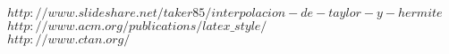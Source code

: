 \documentclass[spanish,a4paper,11pt,twoside]{report}
\begin{document}


{\small $http://www.slideshare.net/taker85/interpolacion-de-taylor-y-hermite$}\\
{\small $http://www.acm.org/publications/latex\_style/$}\\
{\small $http://www.ctan.org/$}
    



%
\nocite{*}



\end{document}
